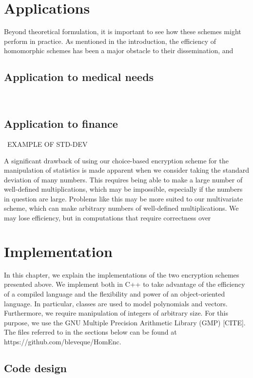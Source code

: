 \documentclass[11pt]{report}
\begin{document}
\chapter{Applications}

Beyond theoretical formulation, it is important to see how these schemes might perform in practice. As mentioned in the introduction, the efficiency of homomorphic schemes has been a major obstacle to their dissemination, and 

\section{Application to medical needs}

\

\section{Application to finance}

\ EXAMPLE OF STD-DEV

A significant drawback of using our choice-based encryption scheme for the manipulation of statistics is made apparent when we consider taking the standard deviation of many numbers. This requires being able to make a large number of well-defined multiplications, which may be impossible, especially if the numbers in question are large. Problems like this may be more suited to our multivariate scheme, which can make arbitrary numbers of well-defined multiplications. We may lose efficiency, but in computations that require correctness over

\chapter{Implementation}
\label{chap:implementation}
In this chapter, we explain the implementations of the two encryption schemes presented above. We implement both in C++ to take advantage of the efficiency of a compiled language and the flexibility and power of an object-oriented language. In particular, classes are used to model polynomials and vectors. Furthermore, we require manipulation of integers of arbitrary size. For this purpose, we use the GNU Multiple Precision Arithmetic Library (GMP) [CITE]. The files referred to in the sections below can be found at https://github.com/bleveque/HomEnc.

\section{Code design}
\end{document}
